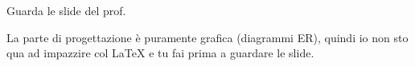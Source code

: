 
Guarda le slide del prof.

La parte di progettazione è puramente grafica (diagrammi ER), quindi io non sto qua ad impazzire col LaTeX e tu fai prima a guardare le slide.

